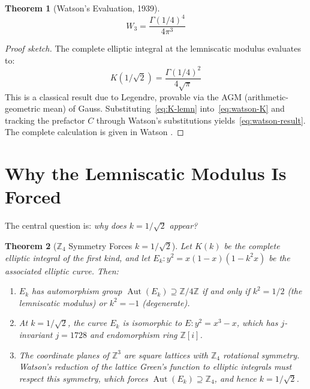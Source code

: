 \documentclass[12pt]{article}
\newtheorem{theorem}{Theorem}[section]
\theoremstyle{definition}
\theoremstyle{remark}
\begin{document}
\begin{theorem}[Watson's Evaluation, 1939]
\label{thm:watson}
\begin{equation}
    W_3 = \frac{\Gamma(1/4)^4}{4\pi^3}
    \label{eq:watson-result}
\end{equation}
\end{theorem}

\begin{proof}[Proof sketch]
The complete elliptic integral at the lemniscatic modulus evaluates to:
\begin{equation}
    K(1/\sqrt{2}) = \frac{\Gamma(1/4)^2}{4\sqrt{\pi}}
    \label{eq:K-lemn}
\end{equation}
This is a classical result due to Legendre, provable via the AGM (arithmetic-geometric mean) of Gauss. Substituting~\eqref{eq:K-lemn} into~\eqref{eq:watson-K} and tracking the prefactor $C$ through Watson's substitutions yields~\eqref{eq:watson-result}. The complete calculation is given in Watson \cite{watson1939}.
\end{proof}

\section{Why the Lemniscatic Modulus Is Forced}
\label{sec:forced}

The central question is: \emph{why does $k = 1/\sqrt{2}$ appear?}

\begin{theorem}[$\mathbb{Z}_4$ Symmetry Forces $k = 1/\sqrt{2}$]
\label{thm:z4-forces-k}
Let $K(k)$ be the complete elliptic integral of the first kind, and let $E_k\!: y^2 = x(1-x)(1-k^2 x)$ be the associated elliptic curve. Then:
\begin{enumerate}[nosep]
    \item $E_k$ has automorphism group $\operatorname{Aut}(E_k) \supseteq \mathbb{Z}/4\mathbb{Z}$ if and only if $k^2 = 1/2$ (the lemniscatic modulus) or $k^2 = -1$ (degenerate).
    \item At $k = 1/\sqrt{2}$, the curve $E_k$ is isomorphic to $E\!: y^2 = x^3 - x$, which has $j$-invariant $j = 1728$ and endomorphism ring $\mathbb{Z}[i]$.
    \item The coordinate planes of $\mathbb{Z}^3$ are square lattices with $\mathbb{Z}_4$ rotational symmetry. Watson's reduction of the lattice Green's function to elliptic integrals must respect this symmetry, which forces $\operatorname{Aut}(E_k) \supseteq \mathbb{Z}_4$, and hence $k = 1/\sqrt{2}$.
\end{enumerate}
\end{theorem}
\end{document}
